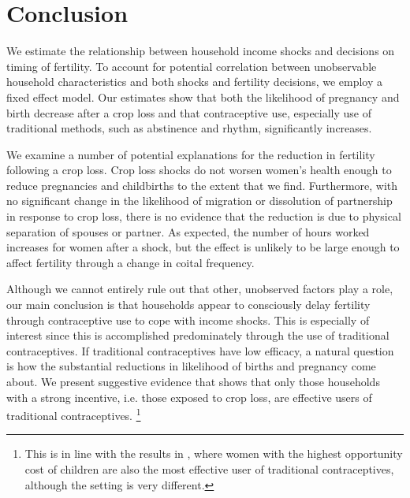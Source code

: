 \documentclass[letterpaper,12pt]{article}
\begin{document}
\section{Conclusion}

We estimate the relationship between household income shocks and decisions
on timing of fertility. 
To account for potential correlation between unobservable household
characteristics and both shocks and fertility decisions, we employ a fixed effect model.
Our estimates show that both the likelihood of pregnancy and birth decrease 
after a crop loss and that contraceptive use, especially use of traditional 
methods, such as abstinence and rhythm, significantly increases. 

We examine a number of potential explanations for the reduction 
in fertility following a crop loss.
Crop loss shocks do not worsen women's health enough to 
reduce pregnancies and childbirths to the extent that we find.
Furthermore, with no significant change in the likelihood of migration or 
dissolution of partnership in response to crop loss, there is no evidence 
that the reduction is due to physical separation of spouses or partner.
As expected, the number of hours worked increases for women after a shock, 
but the effect is unlikely to be large enough to affect fertility 
through a change in coital frequency.

Although we cannot entirely rule out that other, unobserved
factors play a role, our main conclusion is that households appear
to consciously delay fertility through contraceptive use to cope 
with income shocks. 
This is especially of interest since this is accomplished 
predominately through the use of traditional contraceptives.
If traditional contraceptives have low efficacy, a natural question is 
how the substantial reductions in likelihood of births and pregnancy 
come about.
We present suggestive evidence that shows that only those households
with a strong incentive, i.e. those exposed to crop loss, are 
effective users of traditional contraceptives.%
\footnote{
This is in line with the results in \cite{Rosenzweig1989},
where women with the highest opportunity cost of children
are also the most effective user of traditional contraceptives,
although the setting is very different.
}
\end{document}

